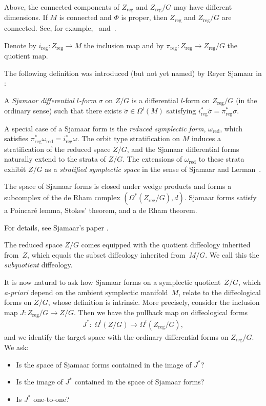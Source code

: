 \documentclass[pdftex]{sigma}
\numberwithin{equation}{section}
\def \red {{\text{red}}}
\def \reg {{\text{reg}}}
\begin{document}
Above, the connected components of $Z_\reg$ and $Z_\reg/G$
may have dif\/ferent dimensions.
If $M$ is connected and $\Phi$ is proper, then $Z_\reg$ and $Z_\reg/G$
are connected. See, for example, \cite{LMTW}~and~\cite{SL}.

Denote by $i_\reg \colon Z_\reg \to M$ the inclusion map
and by $\pi_\reg \colon Z_\reg \to Z_\reg/G$ the quotient map.

The following def\/inition was introduced (but not yet named)
by Reyer Sjamaar in \cite{sjamaar}:

\begin{Definition}
A \emph{Sjamaar differential $l$-form} $\sigma$ on $Z/G$
is a dif\/ferential $l$-form on $Z_\reg/G$ (in the ordinary sense)
such that there exists $\tilde{\sigma}\in\Omega^l(M)$
satisfying $i_{\reg}^*\tilde{\sigma}=\pi_{\reg}^*\sigma$.
\end{Definition}

A special case of a Sjamaar form is the \emph{reduced symplectic form},
$\omega_\red$,
which satisf\/ies $\pi_\reg^* \omega_\red = i_\reg^* \omega$.
The orbit type stratif\/ication on $M$
induces a stratif\/ication of the reduced space $Z/G$,
and the Sjamaar dif\/ferential forms naturally extend to the strata of $Z/G$.
The extensions of $\omega_\red$ to these strata exhibit $Z/G$
as a \emph{stratified symplectic space}
in the sense of Sjamaar and Lerman~\cite{SL}.

The space of Sjamaar forms is closed under wedge products
and forms a subcomplex
of the de Rham complex $(\Omega^*(Z_\reg/G),d)$.
Sjamaar forms satisfy a Poincar\'e lemma, Stokes' theorem,
and a de Rham theorem.

For details, see Sjamaar's paper \cite{sjamaar}.

The reduced space $Z/G$ comes equipped with the quotient dif\/feology inherited from~$Z$, which equals the subset dif\/feology inherited from~$M/G$. We call this
the \emph{subquotient} dif\/feology.

It is now natural to ask how Sjamaar forms on a symplectic quotient~$Z/G$,
which \emph{a-priori} depend on the ambient symplectic manifold~$M$,
relate to the dif\/feological forms on $Z/G$, whose def\/inition is intrinsic.
More precisely, consider the inclusion map
$J \colon Z_\reg/G \to Z/G$. Then we have the pullback map
on dif\/feological forms
\begin{gather*} J^* \colon \ \Omega^l(Z/G) \to \Omega^l(Z_\reg/G) ,\end{gather*}
and we identify the target space with the ordinary dif\/ferential forms
on $Z_\reg/G$. We ask:
\begin{itemize}\itemsep=0pt
\item
Is the space of Sjamaar forms contained in the image of $J^*$?
\item
Is the image of $J^*$ contained in the space of Sjamaar forms?
\item
Is $J^*$ one-to-one?
\end{itemize}
\end{document}

